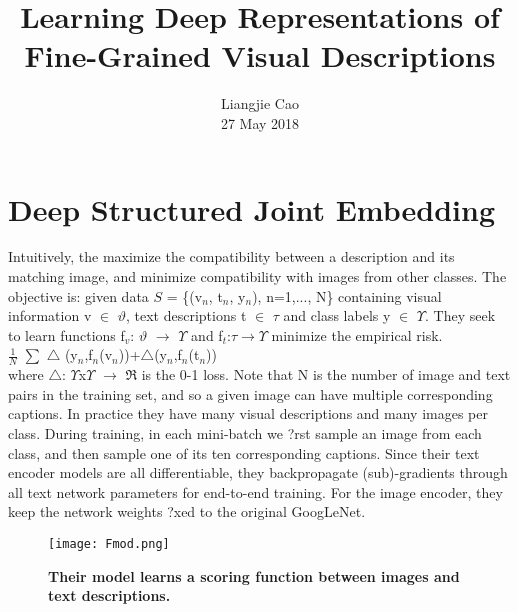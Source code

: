 \documentclass[10pt,twocolumn,letterpaper]{article}
\begin{document}
\title{\textbf{Learning Deep Representations of Fine-Grained Visual Descriptions}}
\author{Liangjie Cao\\27 May 2018}
\maketitle
\par
\section{Deep Structured Joint Embedding}
Intuitively, the maximize the compatibility between a description and its matching image, and minimize compatibility with images from other classes. The objective is: given data $S$ = \{(v$_n$, t$_n$, y$_n$), n=1,..., N\} containing visual information v $\in$ $\vartheta$, text descriptions t $\in$ $\tau$ and class labels y $\in$ $\Upsilon$. They seek to learn functions f$_v$: $\vartheta$ $\to$ $\Upsilon$ and f$_t$:$\tau$$\to$$\Upsilon$ minimize the empirical risk.\\ {\centering $\frac{1}{N}$ $\sum$ $\bigtriangleup$ (y$_n$,f$_n$(v$_n$))+$\bigtriangleup$(y$_n$,f$_n$(t$_n$))}\\ where $\bigtriangleup$: $\Upsilon$x$\Upsilon$ $\to$ $\Re$ is the 0-1 loss. Note that N is the number of image and text pairs in the training set, and so a given image can have multiple corresponding captions. In practice they have many visual descriptions and many images per class. During training, in each mini-batch we ?rst sample an image from each class, and then sample one of its ten corresponding captions. Since their text encoder models are all differentiable, they backpropagate (sub)-gradients through all text network parameters for end-to-end training. For the image encoder, they keep the network weights ?xed to the original GoogLeNet. \begin{figure}[htbp]
 \centering
 \texttt{[image: Fmod.png]}\\
 \caption{\textbf{Their model learns a scoring function between images and text descriptions. }}\label{Figure1}
 \end{figure}
\end{document}
